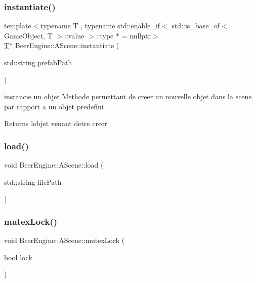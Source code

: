 \subsubsection{\texorpdfstring{instantiate()}{instantiate()}\hspace{0.1cm}{\footnotesize\ttfamily [2/2]}}
{\footnotesize\ttfamily template$<$typename T , typename std\+::enable\+\_\+if$<$ std\+::is\+\_\+base\+\_\+of$<$ Game\+Object, T $>$\+::value $>$\+::type $\ast$  = nullptr$>$ \\
\mbox{\hyperlink{namespace_beer_engine_a94f0b552f6dc910de8cdb44207981f53a8de48e594408f9fc561b2f68ce05f664}{T}}$\ast$ Beer\+Engine\+::\+A\+Scene\+::instantiate (\begin{DoxyParamCaption}\item[{std\+::string}]{prefab\+Path }\end{DoxyParamCaption})\hspace{0.3cm}{\ttfamily [inline]}}



instancie un objet Methode permettant de creer un nouvelle objet dans la scene par rapport a un objet predefini 

\begin{DoxyReturn}{Returns}
l\textquotesingle{}objet venant d\textquotesingle{}etre creer 
\end{DoxyReturn}
\mbox{\label{class_beer_engine_1_1_a_scene_aeedbe75eeef457353645d61a68bc2949}} 
\subsubsection{\texorpdfstring{load()}{load()}}
{\footnotesize\ttfamily void Beer\+Engine\+::\+A\+Scene\+::load (\begin{DoxyParamCaption}\item[{std\+::string}]{file\+Path }\end{DoxyParamCaption})}

\mbox{\label{class_beer_engine_1_1_a_scene_a5c1cc3e869d48b92331fe606eb86497c}} 
\subsubsection{\texorpdfstring{mutex\+Lock()}{mutexLock()}}
{\footnotesize\ttfamily void Beer\+Engine\+::\+A\+Scene\+::mutex\+Lock (\begin{DoxyParamCaption}\item[{bool}]{lock }\end{DoxyParamCaption})}




